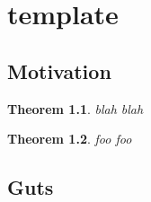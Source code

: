 

\newtheorem{theorem}{Theorem}[section]
\newtheorem{proposition}[theorem]{Proposition}
\newtheorem{corollary}[theorem]{Corollary}
\newtheorem{lemma}[theorem]{Lemma}
\newtheorem{remark}[theorem]{Remark}
\newtheorem{definition}[theorem]{Definition}

\chapter{template}
\label{chap:template}
{}
\date{Aug XX, 2009}

\beginArtWithToc

\section{Motivation}

\begin{theorem}
blah blah
\end{theorem}

\begin{theorem}
foo foo
\end{theorem}

\section{Guts}

\EndNoBibArticle

